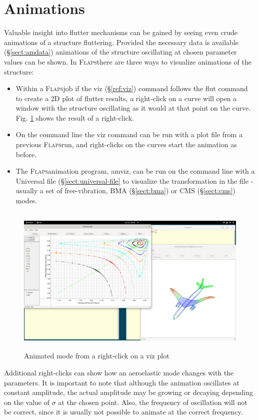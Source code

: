 \documentclass[11pt,openany,twoside]{book}
\numberwithin{equation}{section}		%
\newcommand{\Cmd}[1]{{\sf #1}}
\newcommand{\Flaps}{\textsc{Flaps\:}}
\newcommand{\Sectref}[1]{\S\ref{#1}}
\newcommand{\Figref}[1]{Fig. \ref{#1}}  %
\begin{document}

\section{Animations}\label{sect:animation}
Valuable insight into flutter mechanisms can be gained by seeing
even crude animations of a structure fluttering.
Provided the necessary data is available (\Sectref{sect:amdata}) animations
of the structure oscillating at chosen parameter values can be shown.
In \Flaps there are three ways to visualize animations of the structure:
\begin{itemize}
	\item Within a \Flaps job if the \Cmd{viz} (\Sectref{ref:viz})
	   command follows the \Cmd{flut} command to create a 2D plot of flutter
		results, a right-click on a curve will open a window with the structure
		oscillating as it would at that point on the curve.
		\Figref{fig:viz-amviz} shows the result of a right-click.
	\item On the command line the \Cmd{viz} command can be run
		with a plot file from a previous \Flaps run, and right-clicks
		on the curves start the animation as before.
	\item The \Flaps animation program, \Cmd{amviz}, can be run
		on the command line with a Universal file (\Sectref{sect:universal-file}
		to visualize the transformation in the file - usually a set of free-vibration,
		BMA (\Sectref{sect:bma}) or CMS (\Sectref{sect:cms}) modes.
\end{itemize}
\begin{figure}[ht] 	%
		\includegraphics[height=7.2cm,width=13cm]{viz-amviz.png}
	\centering
	\caption{Animated mode from a right-click on a \Cmd{viz} plot}\label{fig:viz-amviz}
\end{figure}
Additional right-clicks can show how an aeroelastic mode changes with the parameters.
It is important to note that although the animation oscillates at
constant amplitude, the actual amplitude may be growing or decaying
depending on the value of $\sigma$ at the chosen point.
Also, the frequency of oscillation will not be correct, since it
is usually not possible to animate at the correct frequency.
\end{document}
